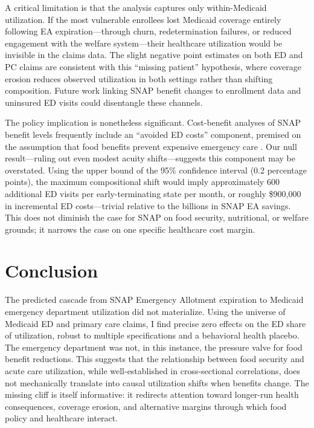 \documentclass[12pt]{article}
\begin{document}
A critical limitation is that the analysis captures only within-Medicaid utilization. If the most vulnerable enrollees lost Medicaid coverage entirely following EA expiration---through churn, redetermination failures, or reduced engagement with the welfare system---their healthcare utilization would be invisible in the claims data. The slight negative point estimates on both ED and PC claims are consistent with this ``missing patient'' hypothesis, where coverage erosion reduces observed utilization in both settings rather than shifting composition. Future work linking SNAP benefit changes to enrollment data and uninsured ED visits could disentangle these channels.

The policy implication is nonetheless significant. Cost-benefit analyses of SNAP benefit levels frequently include an ``avoided ED costs'' component, premised on the assumption that food benefits prevent expensive emergency care \citep{berkowitz2018food}. Our null result---ruling out even modest acuity shifts---suggests this component may be overstated. Using the upper bound of the 95\% confidence interval (0.2 percentage points), the maximum compositional shift would imply approximately 600 additional ED visits per early-terminating state per month, or roughly \$900,000 in incremental ED costs---trivial relative to the billions in SNAP EA savings. This does not diminish the case for SNAP on food security, nutritional, or welfare grounds; it narrows the case on one specific healthcare cost margin.

\section{Conclusion}

The predicted cascade from SNAP Emergency Allotment expiration to Medicaid emergency department utilization did not materialize. Using the universe of Medicaid ED and primary care claims, I find precise zero effects on the ED share of utilization, robust to multiple specifications and a behavioral health placebo. The emergency department was not, in this instance, the pressure valve for food benefit reductions. This suggests that the relationship between food security and acute care utilization, while well-established in cross-sectional correlations, does not mechanically translate into causal utilization shifts when benefits change. The missing cliff is itself informative: it redirects attention toward longer-run health consequences, coverage erosion, and alternative margins through which food policy and healthcare interact.
\end{document}
